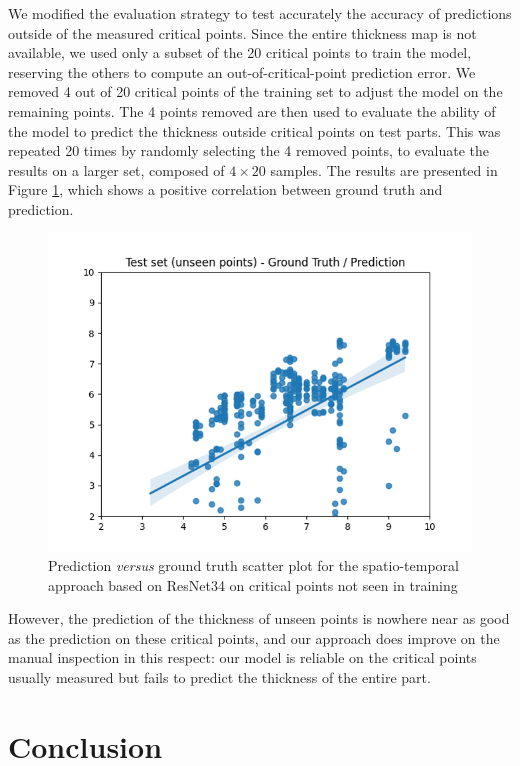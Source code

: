 We modified the evaluation strategy to test accurately the accuracy of predictions outside of the measured critical points.
Since the entire thickness map is not available, we used only a subset of the 20 critical points to train the model, reserving the others to compute an out-of-critical-point prediction error. We removed 4 out of 20 critical points of the training set to adjust the model on the remaining points. The 4 points removed are then used to evaluate the ability of the model to predict the thickness outside critical points on test parts. This was repeated 20 times by randomly selecting the 4 removed points, to evaluate the results on a larger set, composed of $4\times20$ samples.
The results are presented in Figure \ref{fig:gt_prediction_unseen}, which shows a positive correlation between ground truth and prediction. 
%
\begin{figure}
\centering
\includegraphics[scale=0.90]{images/chapter_4/unseen_point_scatter.png}
\caption{Prediction \textit{versus} ground truth scatter plot for the spatio-temporal approach based on ResNet34 on critical points not seen in training}
\label{fig:gt_prediction_unseen}
\end{figure}
%
However, the prediction of the thickness of unseen points is nowhere near as good as the prediction on these critical points, and our approach does improve on the manual inspection in this respect: our model is reliable on the critical points usually measured but fails to predict the thickness of the entire part.

\section{Conclusion}

